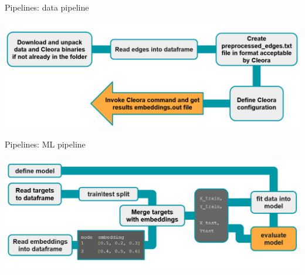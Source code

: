 \begin{frame}{Pipelines: data pipeline}
\begin{center}
\includegraphics[width=1\textwidth]{images/dataPipeline.png}
\end{center}
\end{frame}

\begin{frame}{Pipelines: ML pipeline}
\begin{center}
\includegraphics[width=1\textwidth]{images/MLpipeline.png}  
\end{center}
\end{frame}